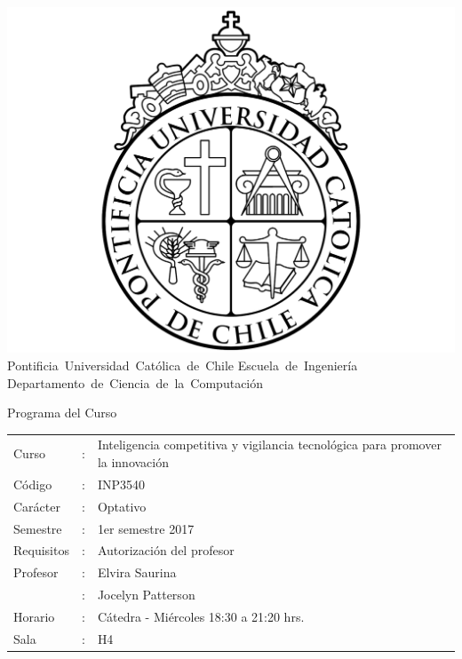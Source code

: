 \documentclass[11pt,letterpaper]{article}
\begin{document}
\raisebox{-18pt}
{\includegraphics[scale=0.1]{./Img/logo_puc.pdf}}
\vbox{
  \hbox{\sc Pontificia Universidad Católica de Chile}
  \hbox{\sc Escuela de Ingeniería}
  \hbox{\sc Departamento de Ciencia de la Computación}
}

\begin{center}
  \vspace{2ex}\Large Programa del Curso \\
\end{center}

\begin{tabular}{ l c l}
  Curso      & : & Inteligencia competitiva y vigilancia tecnológica para promover la innovación \\
  Código     & : & INP3540 \\
  Carácter   & : & Optativo \\
  Semestre   & : & 1er semestre 2017 \\
  Requisitos & : & Autorización del profesor \\
  Profesor   & : & Elvira Saurina \\
             & : & Jocelyn Patterson \\
  Horario    & : & Cátedra - Miércoles 18:30 a 21:20 hrs. \\
  Sala       & : & H4 \\
\end{tabular}
\end{document}
